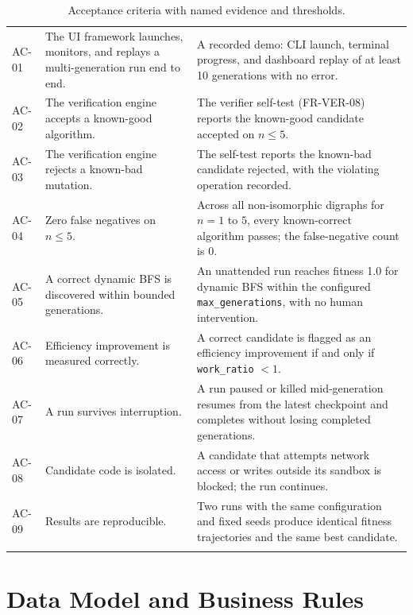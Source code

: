 \documentclass[12pt,a4paper]{article}
\begin{document}
\begin{center}
\begin{longtable}{@{}p{2.6cm}p{6.4cm}p{4.2cm}@{}}
AC-01 & The UI framework launches, monitors, and replays a multi-generation run end to end. & A recorded demo: CLI launch, terminal progress, and dashboard replay of at least 10 generations with no error. \\
\addlinespace[2pt]
AC-02 & The verification engine accepts a known-good algorithm. & The verifier self-test (FR-VER-08) reports the known-good candidate accepted on $n \le 5$. \\
\addlinespace[2pt]
AC-03 & The verification engine rejects a known-bad mutation. & The self-test reports the known-bad candidate rejected, with the violating operation recorded. \\
\addlinespace[2pt]
AC-04 & Zero false negatives on $n \le 5$. & Across all non-isomorphic digraphs for $n=1$ to $5$, every known-correct algorithm passes; the false-negative count is 0. \\
\addlinespace[2pt]
AC-05 & A correct dynamic BFS is discovered within bounded generations. & An unattended run reaches fitness 1.0 for dynamic BFS within the configured \texttt{max\_generations}, with no human intervention. \\
\addlinespace[2pt]
AC-06 & Efficiency improvement is measured correctly. & A correct candidate is flagged as an efficiency improvement if and only if \texttt{work\_ratio} $< 1$. \\
\addlinespace[2pt]
AC-07 & A run survives interruption. & A run paused or killed mid-generation resumes from the latest checkpoint and completes without losing completed generations. \\
\addlinespace[2pt]
AC-08 & Candidate code is isolated. & A candidate that attempts network access or writes outside its sandbox is blocked; the run continues. \\
\addlinespace[2pt]
AC-09 & Results are reproducible. & Two runs with the same configuration and fixed seeds produce identical fitness trajectories and the same best candidate. \\
\bottomrule
\caption{Acceptance criteria with named evidence and thresholds.}
\label{tab:acceptance}
\end{longtable}
\end{center}

\section{Data Model and Business Rules}
\label{sec:srsdata}
\end{document}
